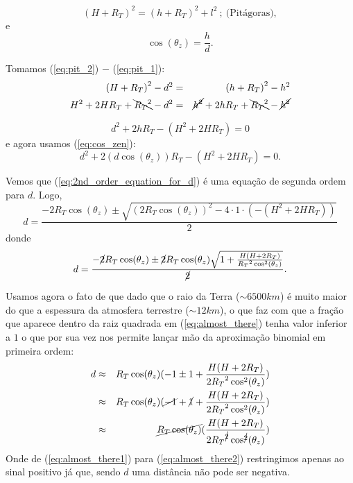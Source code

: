 \documentclass[12pt,a4paper]{article}
\begin{document}
	\begin{equation}
		{(H + R_T)}^2 = {(h + R_T)}^2 + l^2 \ ;\ \text{(Pitágoras)}  \label{eq:pit_2},
	\end{equation}
	e
	\begin{equation}
		\cos(\theta_z) = \frac{h}{d}   \label{eq:cos_zen}.
	\end{equation}

	Tomamos (\ref{eq:pit_2})  $-$ (\ref{eq:pit_1}):
	\begin{eqnarray}
		{(H + R_T)}^2 - d^2 &=& {(h + R_T)}^2 - h^2 \\
		H^2 + 2 H R_T + \bcancel{{R_T}^2} - d^2 &=& \cancel{h^2}  + 2 h R_T + \bcancel{{R_T}^2} - \cancel{h^2} 
	\end{eqnarray}

	\begin{equation}
		 d^2 + 2 h R_T - (H^2 + 2 H R_T) = 0
	\end{equation}
	e agora usamos (\ref{eq:cos_zen}):
	\begin{equation}
		 d^2 + 2 (d\cos(\theta_z)) R_T - (H^2 + 2 H R_T) = 0. \label{eq:2nd_order_equation_for_d}
	\end{equation}

	Vemos que (\ref{eq:2nd_order_equation_for_d}) é uma equação de segunda ordem para $d$. Logo, 
	\begin{equation}
		d = \frac{-2R_T\cos(\theta_z) \pm \sqrt{ {(2R_T\cos(\theta_z))}^2-4\cdot 1 \cdot (-(H^2 + 2H R_T)) }}{2}	
	\end{equation}
	donde
	\begin{equation}
		d = \frac{-\cancel{2}R_T\cos(\theta_z) \pm \cancel{2}R_T\cos(\theta_z)\sqrt{ 1 +  \frac{H(H + 2R_T)}{{R_T}^2\cos^2(\theta_z)} }}{\cancel{2}}	.
		\label{eq:almost_there}
	\end{equation}

	Usamos agora o fato de que dado que o raio da Terra ($\sim 6500 km$) é
	muito maior do que a espessura da atmosfera terrestre ($\sim 12 km$), o que
	faz com que a fração que aparece dentro da raiz quadrada em
	(\ref{eq:almost_there}) tenha valor inferior a $1$ o que por sua vez nos
	permite lançar mão da aproximação binomial em primeira ordem:
	\begin{eqnarray}
		d &\approx& R_T\cos(\theta_z)(-1 \pm { 1 + \frac{H(H + 2R_T)}{2{R_T}^2\cos^2(\theta_z)}}) \label{eq:almost_there1}\\
		  &\approx& R_T\cos(\theta_z)(\cancel{-1} + \cancel{1} + \frac{H(H + 2R_T)}{2{R_T}^2\cos^2(\theta_z)}) \label{eq:almost_there2}\\
		  &\approx& \cancel{R_T\cos(\theta_z)}(\frac{H(H + 2R_T)}{2{R_T}^{\cancel{2}}\cos^{\cancel{2}}(\theta_z)})
	\end{eqnarray}
	Onde de (\ref{eq:almost_there1}) para (\ref{eq:almost_there2}) restringimos
	apenas ao sinal positivo já que, sendo $d$ uma distância não pode ser
	negativa.
\end{document}
